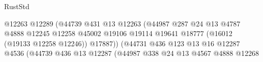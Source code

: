 \begin{lexlean}{RustStd}
\begin{coremodule}
                                                          @12263
                                                          @12289
                                                          (@44739
                                                            @431
                                                            @13
                                                            @12263
                                                            (@44987
                                                              @287
                                                              @24
                                                              @13
                                                              @4787
                                                              @4888
                                                              @12245
                                                              @12258
                                                              @45002
                                                              @19106
                                                              @19114
                                                              @19641
                                                              @18777
                                                              (@16012 (@19133 @12258 @12246))
                                                              @17887))
                                                          (@44731
                                                            @436
                                                            @123
                                                            @13
                                                            @16
                                                            @12287
                                                            @4536
                                                            (@44739
                                                              @436
                                                              @13
                                                              @12287
                                                              (@44987
                                                                @338
                                                                @24
                                                                @13
                                                                @4567
                                                                @4888
                                                                @12268

\end{coremodule}
\end{lexlean}
